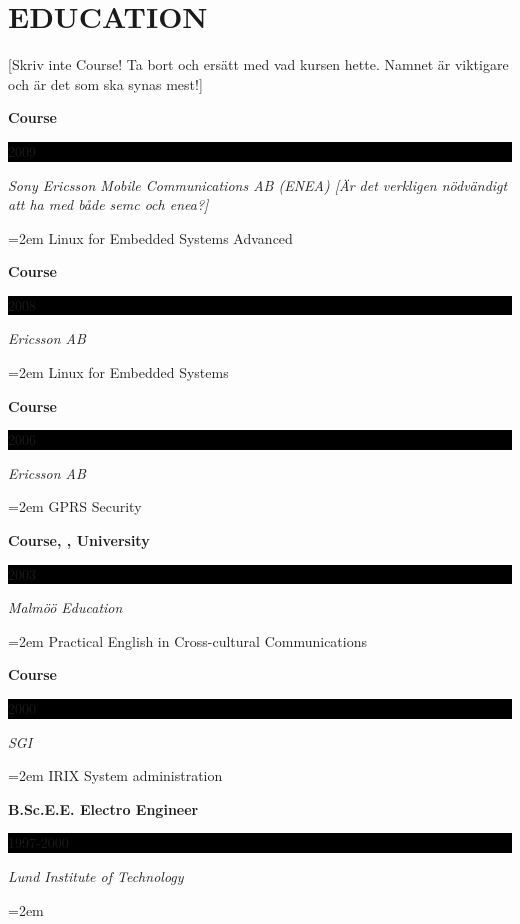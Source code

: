 \documentclass[paper=a4,fontsize=11pt]{scrartcl}
\newcommand{\sepspace}{\vspace*{1em}}
\newcommand{\NewPart}[1]{\section*{\uppercase{#1}}}
\newcommand{\EducationEntry}[4]{
		\noindent \textbf{#1} \hfill 					%
		\colorbox{Black}{%
			\parbox{6em}{%
			\hfill\color{White}#2}} \par				%
		\noindent \textit{#3} \par					%
		\noindent\hangindent=2em\hangafter=0 \small #4 	%
		\normalsize \par}
\begin{document}
\NewPart{Education}{}

[Skriv inte Course! Ta bort och ersätt med vad kursen hette. Namnet är viktigare och är det som ska synas mest!]

\EducationEntry {Course}{2009}{Sony Ericsson Mobile Communications AB (ENEA) [Är det verkligen nödvändigt att ha med både semc och enea?]}
{Linux for Embedded Systems Advanced}	
\sepspace

\EducationEntry {Course}{2008}{Ericsson AB}
{Linux for Embedded Systems}	
\sepspace

\EducationEntry {Course}{2006}{Ericsson AB}
{GPRS Security}	
\sepspace

\EducationEntry{Course, , University}{2003}{Malm\"{o}ö Education}
{Practical English in Cross-cultural Communications}
\sepspace

\EducationEntry {Course}{2000}{SGI}
{IRIX System administration}	
\sepspace

\EducationEntry{B.Sc.E.E. Electro Engineer}{1997-2000}{Lund Institute of Technology} {}
\end{document}
